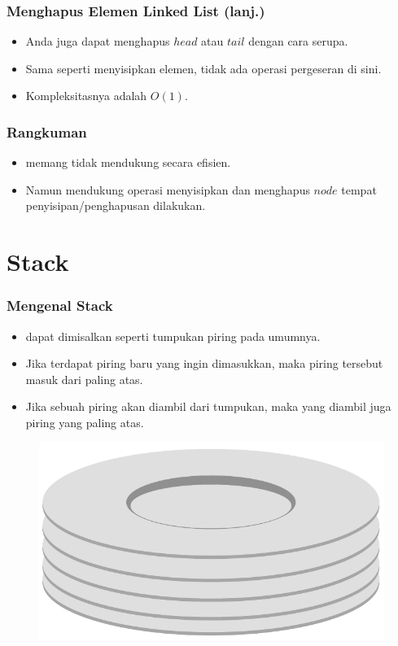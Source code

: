 \begin{frame}
\frametitle{Menghapus Elemen Linked List (lanj.)}
\begin{itemize}
  \item Anda juga dapat menghapus $head$ atau $tail$ dengan cara serupa.
  \item Sama seperti menyisipkan elemen, tidak ada operasi pergeseran di sini.
  \item Kompleksitasnya adalah $O(1)$.
\end{itemize}
\end{frame}

\begin{frame}
\frametitle{Rangkuman}
\begin{itemize}
  \item {} memang tidak mendukung  secara efisien.
  \item Namun  mendukung operasi menyisipkan dan menghapus  $node$ tempat penyisipan/penghapusan dilakukan.
\end{itemize}
\end{frame}

\section{Stack}

\begin{frame}
\frametitle{Mengenal Stack}
\begin{itemize}
  \item {} dapat dimisalkan seperti tumpukan piring pada umumnya.
  \item Jika terdapat piring baru yang ingin dimasukkan, maka piring tersebut masuk dari paling atas.
  \item Jika sebuah piring akan diambil dari tumpukan, maka yang diambil juga piring yang paling atas.
\end{itemize}

\begin{figure}
  \centering
  \includegraphics[width=4 cm]{asset/plates-stack.pdf}
\end{figure}
\end{frame}

